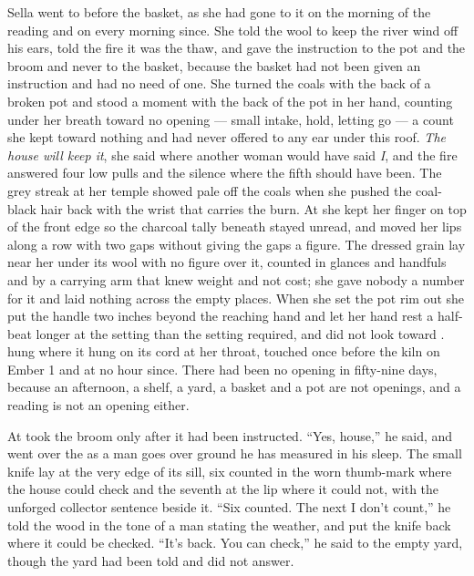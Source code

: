Sella went to  before the basket, as she had gone to it on the morning of the reading and on every morning since. She told the wool to keep the river wind off his ears, told the fire it was the thaw, and gave the instruction to the pot and the broom and never to the basket, because the basket had not been given an instruction and had no need of one. She turned the coals with the back of a broken pot and stood a moment with the back of the pot in her hand, counting under her breath toward no opening --- small intake, hold, letting go --- a count she kept toward nothing and had never offered to any ear under this roof. \emph{The house will keep it}, she said where another woman would have said \emph{I}, and the fire answered four low pulls and the silence where the fifth should have been. The grey streak at her temple showed pale off the coals when she pushed the coal-black hair back with the wrist that carries the burn. At  she kept her finger on top of the front edge so the charcoal tally beneath stayed unread, and moved her lips along a row with two gaps without giving the gaps a figure. The dressed grain lay near her under its wool with no figure over it, counted in glances and handfuls and by a carrying arm that knew weight and not cost; she gave nobody a number for it and laid nothing across the empty places. When she set the pot rim out she put the handle two inches beyond the reaching hand and let her hand rest a half-beat longer at the setting than the setting required, and did not look toward .  hung where it hung on its cord at her throat, touched once before the kiln on Ember 1 and at no hour since. There had been no opening in fifty-nine days, because an afternoon, a shelf, a yard, a basket and a pot are not openings, and a reading is not an opening either.

At   took the broom only after it had been instructed. “Yes, house,” he said, and went over the  as a man goes over ground he has measured in his sleep. The small knife lay at the very edge of its sill, six counted in the worn thumb-mark where the house could check and the seventh at the lip where it could not, with the unforged collector sentence beside it. “Six counted. The next I don't count,” he told the wood in the tone of a man stating the weather, and put the knife back where it could be checked. “It's back. You can check,” he said to the empty yard, though the yard had been told and did not answer.

